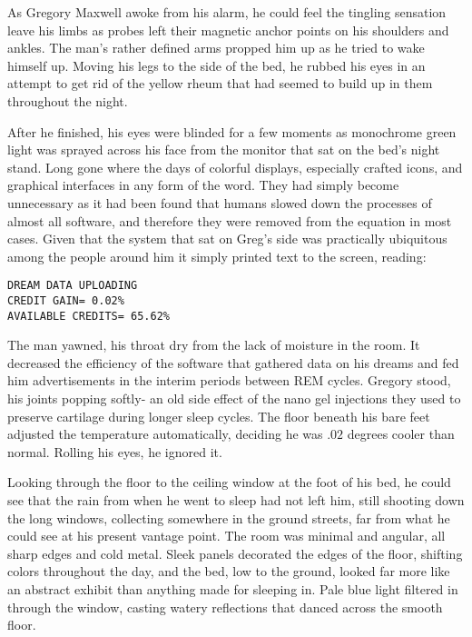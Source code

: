 As Gregory Maxwell awoke from his alarm, he could feel the tingling sensation leave his limbs as probes left their magnetic anchor points on his shoulders and ankles.
The man’s rather defined arms propped him up as he tried to wake himself up.
Moving his legs to the side of the bed, he rubbed his eyes in an attempt to get rid of the yellow rheum that had seemed to build up in them throughout the night.

After he finished, his eyes were blinded for a few moments as monochrome green light was sprayed across his face from the monitor that sat on the bed’s night stand.
Long gone where the days of colorful displays, especially crafted icons, and graphical interfaces in any form of the word.
They had simply become unnecessary as it had been found that humans slowed down the processes of almost all software, and therefore they were removed from the equation in most cases.
Given that the system that sat on Greg’s side was practically ubiquitous among the people around him it simply printed text to the screen, reading:
\begin{center}
\verb|DREAM DATA UPLOADING|\\
\verb|CREDIT GAIN= 0.02%|\\
\verb|AVAILABLE CREDITS= 65.62%|
\end{center}
The man yawned, his throat dry from the lack of moisture in the room.
It decreased the efficiency of the software that gathered data on his dreams and fed him advertisements in the interim periods between REM cycles.
Gregory stood, his joints popping softly- an old side effect of the nano gel injections they used to preserve cartilage during longer sleep cycles.
The floor beneath his bare feet adjusted the temperature automatically, deciding he was $.02$ degrees cooler than normal.
Rolling his eyes, he ignored it.

Looking through the floor to the ceiling window at the foot of his bed, he could see that the rain from when he went to sleep
had not left him, still shooting down the long windows, collecting somewhere in the ground streets, far from what he could see at his present vantage point.
The room was minimal and angular, all sharp edges and cold metal.
Sleek panels decorated the edges of the floor, shifting colors throughout the day, and the bed, low to the ground, looked far more like an abstract exhibit than anything made for sleeping in.
Pale blue light filtered in through the window, casting watery reflections that danced across the smooth floor.

